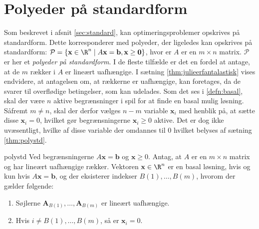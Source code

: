 \section{Polyeder på standardform}
\label{afsnit:fisk}
%
Som beskrevet i afsnit \ref{sec:standard}, kan optimeringsproblemer opskrives på standardform.
Dette korresponderer med polyeder, der ligeledes kan opskrives på standardform: 
$\mathcal{P}=\{ \mathbf{x} \in \R^n  \mid  A\mathbf{x}=\mathbf{b}, \mathbf{x} \geq \mathbf{0} \}$, hvor er $A$ er en $m \times n$ matrix.
$\mathcal{P}$ er her et \textit{polyeder på standardform}.
I de fleste tilfælde er det en fordel at antage, at de $m$ rækker i $A$ er lineært uafhængige.
I sætning \ref{thm:julieerfantalastisk} vises endvidere, at antagelsen om, at rækkerne er uafhængige, kan foretages, da de svarer til overflødige betingelser, som kan udelades.
Som det ses i \ref{defn:basal}, skal der være $n$ aktive begrænsninger i spil for at finde en basal mulig løsning.
Såfremt $m \neq n$, skal der derfor vælges $n-m$ variable $\textbf{x}_i$ med henblik på, at sætte disse $\textbf{x}_i=0$, hvilket gør begrænsningerne $\textbf{x}_i \geq 0$ aktive.
Det er dog ikke uvæsentligt, hvilke af disse variable der omdannes til $0$ hvilket belyses af sætning \ref{thm:polystd}.
%
\begin{thm}{}{polystd}
Ved begrænsningerne $A\textbf{x}=\mathbf{b}$ og $\textbf{x}\geq 0$.
Antag, at $A$ er en $m \times n$ matrix og har lineært uafhængige rækker.
Vektoren $\textbf{x} \in \R^n$ er en basal løsning, hvis og kun hvis $A\textbf{x}=\mathbf{b}$, og der eksisterer indekser $B(1),\ldots,B(m)$, hvorom der gælder følgende:
\begin{enumerate}[label=(\alph*)]
\item Søjlerne $\mathbf{A}_{B(1)},\ldots,\mathbf{A}_{B(m)}$ er lineært uafhængige.
\item Hvis $i \neq B(1),\ldots, B(m)$, så er $\textbf{x}_i=0$.
\end{enumerate}
\end{thm}
